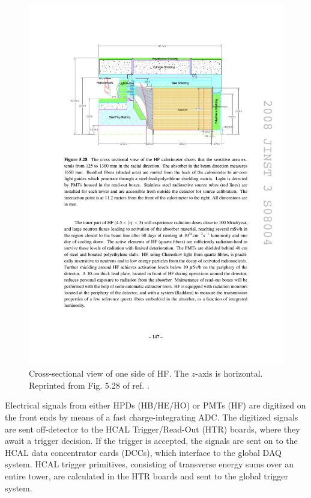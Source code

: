 \documentclass[dissertation.tex]{subfiles}
\begin{document}
\begin{figure}
	\centering
	\includegraphics[scale=1.0]{HCAL_HF_xsec}
	\caption{Cross-sectional view of one side of HF.  The $z$-axis is horizontal.  Reprinted from Fig. 5.28 of ref. \cite{1748-0221-3-08-S08004}.}
	\label{fig:HCAL_HF_xsec}
\end{figure}

Electrical signals from either HPDs (HB/HE/HO) or PMTs (HF) are digitized on the front ends by means of a fast charge-integrating ADC.  The digitized signals are sent off-detector to the HCAL Trigger/Read-Out (HTR) boards, where they await a trigger decision.  If the trigger is accepted, the signals are sent on to the HCAL data concentrator cards (DCCs), which interface to the global DAQ system.  HCAL trigger primitives, consisting of transverse energy sums over an entire tower, are calculated in the HTR boards and sent to the global trigger system.
\end{document}
